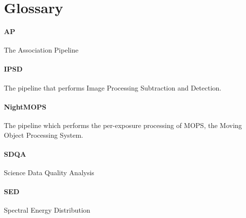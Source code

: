 \section{Glossary}

\paragraph{AP}
The Association Pipeline

\paragraph{IPSD}
The pipeline that performs Image Processing Subtraction and Detection.

\paragraph{NightMOPS}
The pipeline which performs the per-exposure processing of MOPS, the
Moving Object Processing System.

\paragraph{SDQA}
Science Data Quality Analysis

\paragraph{SED}
Spectral Energy Distribution
